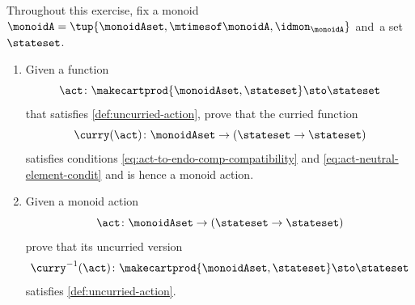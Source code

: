 \begin{gradedexercise}
Throughout this exercise, fix a monoid $\monoidA = \tup{\monoidAset, \mtimesof\monoidA, \idmon_\monoidA}$ and~a set $\stateset$. 
\begin{enumerate}
\item Given a function
    \begin{equation}
    \act \colon \makecartprod{\monoidAset, \stateset} \sto \stateset
    \end{equation}
    that satisfies \cref{def:uncurried-action}, prove that the curried function
    \begin{equation}
    \curry(\act) \colon  \monoidAset \to (\stateset \to \stateset)
    \end{equation}
    satisfies conditions \cref{eq:act-to-endo-comp-compatibility} and \cref{eq:act-neutral-element-condit} and is hence a monoid action. 
    \item Given a monoid action 
    \begin{equation}
    \act \colon  \monoidAset \to (\stateset \to \stateset)
    \end{equation}
    prove that its uncurried version 
    \begin{equation}
    \curry^{-1}(\act) \colon  \makecartprod{\monoidAset, \stateset} \sto \stateset
    \end{equation}
    satisfies \cref{def:uncurried-action}. 
\end{enumerate}
\end{gradedexercise}

